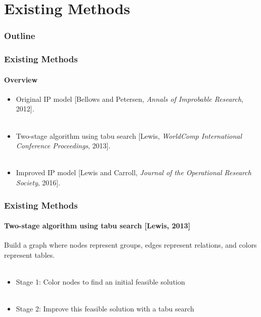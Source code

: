 \documentclass{beamer}
\newcommand{\AutoSectionTitle}{}
\begin{document}


\renewcommand{\AutoSectionTitle}{Existing Methods}

\section{\AutoSectionTitle}

\begin{frame}
  \frametitle{Outline}
  \tableofcontents[currentsection]
\end{frame}




\begin{frame}
  \frametitle{\AutoSectionTitle}
  \framesubtitle{Overview}
  
  \begin{itemize}
  \item Original IP model [Bellows and Petersen, \emph{Annals of Improbable Research}, 2012]. \\~\\
  \item Two-stage algorithm using tabu search [Lewis, \emph{WorldComp International Conference Proceedings}, 2013]. \\~\\
  \item Improved IP model [Lewis and Carroll, \emph{Journal of the Operational Research Society}, 2016].
  \end{itemize}
  
\end{frame}




\begin{frame}
  \frametitle{\AutoSectionTitle}
  \framesubtitle{Two-stage algorithm using tabu search [Lewis, 2013]}
  
  Build a graph where nodes represent groups, edges represent relations, and colors represent tables. \\~\\

  \pause

  \begin{itemize}
  \item Stage 1: Color nodes to find an initial feasible solution \\~\\
    
    \pause
    
  \item Stage 2: Improve this feasible solution with a tabu search
  \end{itemize}
  
\end{frame}
\end{document}

